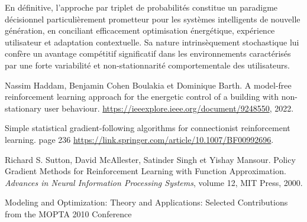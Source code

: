 \documentclass[a4paper,11pt]{article}
\begin{document}
En définitive, l'approche par triplet de probabilités constitue un paradigme décisionnel particulièrement prometteur pour les systèmes intelligents de nouvelle génération, en conciliant efficacement optimisation énergétique, expérience utilisateur et adaptation contextuelle. Sa nature intrinsèquement stochastique lui confère un avantage compétitif significatif dans les environnements caractérisés par une forte variabilité et non-stationnarité comportementale des utilisateurs.

\appendix

% 
% 
\clearpage
\newpage
\begin{thebibliography}{9}
 Nassim Haddam, Benjamin Cohen Boulakia et Dominique Barth. 
A model-free reinforcement learning approach for the energetic control of a building with non-stationary user behaviour.
\url{https://ieeexplore.ieee.org/document/9248550}, 2022.

 Simple statistical gradient-following algorithms for connectionist reinforcement learning. 
page 236 
\url{https://link.springer.com/article/10.1007/BF00992696}.

 Richard S. Sutton, David McAllester, Satinder Singh et Yishay Mansour.
Policy Gradient Methods for Reinforcement Learning with Function Approximation.
\emph{Advances in Neural Information Processing Systems}, volume 12, MIT Press, 2000.

 Modeling and Optimization: Theory and Applications: Selected Contributions from the MOPTA 2010 Conference

\end{thebibliography}
\end{document}
